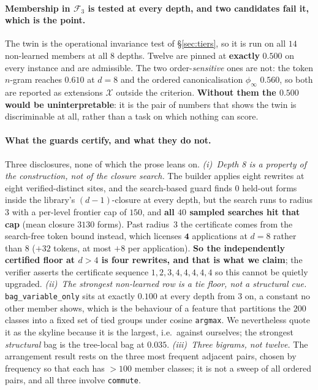 \paragraph{Membership in $\mathcal{F}_3$ is tested at every depth, and two candidates fail it, which is the point.} The twin is the operational invariance test of \S\ref{sec:tiers}, so it is run on all $14$ non-learned members at all $8$ depths. Twelve are pinned at \textbf{exactly} $0.500$ on every instance and are admissible. The two order-\emph{sensitive} ones are not: the token $n$-gram reaches $0.610$ at $d{=}8$ and the ordered canonicalisation $\phi_\infty$ $0.560$, so both are reported as extensions $\mathcal{X}$ outside the criterion. \textbf{Without them the $0.500$ would be uninterpretable}: it is the pair of numbers that shows the twin is discriminable at all, rather than a task on which nothing can score.

\paragraph{What the guards certify, and what they do not.} Three disclosures, none of which the prose leans on. \emph{(i)~Depth 8 is a property of the construction, not of the closure search.} The builder applies eight rewrites at eight verified-distinct sites, and the search-based guard finds $0$ held-out forms inside the library's $(d{-}1)$-closure at every depth, but the search runs to radius $3$ with a per-level frontier cap of $150$, and \textbf{all $40$ sampled searches hit that cap} (mean closure $3130$ forms). Past radius~$3$ the certificate comes from the search-free token bound instead, which licenses $\mathbf{4}$ applications at $d{=}8$ rather than $8$ ($+32$ tokens, at most $+8$ per application). \textbf{So the independently certified floor at $d{>}4$ is four rewrites, and that is what we claim}; the verifier asserts the certificate sequence $1,2,3,4,4,4,4,4$ so this cannot be quietly upgraded. \emph{(ii)~The strongest non-learned row is a tie floor, not a structural cue.} \texttt{bag\_variable\_only} sits at exactly $0.100$ at every depth from $3$ on, a constant no other member shows, which is the behaviour of a feature that partitions the $200$ classes into a fixed set of tied groups under cosine \texttt{argmax}. We nevertheless quote it as the skyline because it is the largest, i.e.\ against ourselves; the strongest \emph{structural} bag is the tree-local bag at $0.035$. \emph{(iii)~Three bigrams, not twelve.} The arrangement result rests on the three most frequent adjacent pairs, chosen by frequency so that each has ${>}100$ member classes; it is not a sweep of all ordered pairs, and all three involve \texttt{commute}.

